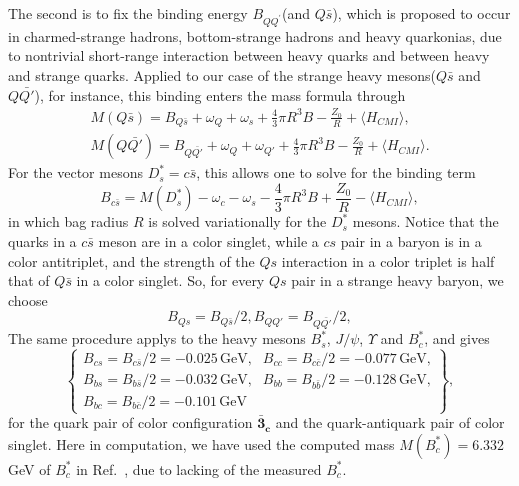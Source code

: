 \documentclass[12pt,onecolumn,floatfix,nofootinbib]{revtex4}
\begin{document}
The second is to fix the binding energy $B_{QQ^{\prime }}$(and $Q\bar{s}$),
which is proposed \cite{KR:2014gca} to occur in charmed-strange hadrons,
bottom-strange hadrons and heavy quarkonias, due to nontrivial short-range
interaction between heavy quarks and between heavy and strange quarks\cite%
{KR:2014gca,Karliner:2017elp,Karliner:2018bms}. Applied to our case of the
strange heavy mesons($Q\bar{s}$ and $Q\bar{Q\prime }$), for instance, this
binding enters the mass formula through
\begin{equation}
\begin{aligned}
M(Q\bar{s})=B_{Q\bar{s}}+\omega_{Q}+\omega_{s}+\frac{4}{3}\pi
R^{3}B-\frac{Z_{0}}{R}+ \langle H_{CMI} \rangle, \\
M(Q\bar{Q\prime})=B_{Q\bar{Q\prime}}+\omega_{Q}+\omega_{Q\prime}+\frac{4}{3}%
\pi R^{3}B-\frac{Z_{0}}{R}+ \langle H_{CMI} \rangle. \end{aligned}
\label{HLm0}
\end{equation}%
For the vector mesons $D_{s}^{\ast }=c\bar{s}$, this allows one to solve for
the binding term
\begin{equation}
B_{c\bar{s}}=M(D_{s}^{\ast })-\omega _{c}-\omega _{s}-\frac{4}{3}\pi R^{3}B+%
\frac{Z_{0}}{R}-\langle H_{CMI}\rangle ,  \label{BB0}
\end{equation}%
in which bag radius $R$ is solved variationally for the $D_{s}^{\ast }$
mesons. Notice that the quarks in a $c\bar{s}$ meson are in a color singlet,
while a $cs$ pair in a baryon is in a color antitriplet, and the strength of
the $Qs$ interaction in a color triplet is half that of $Q\bar{s}$ in a
color singlet. So, for every $Qs$ pair in a strange heavy baryon, we choose
\begin{equation}
B_{Qs}=B_{Q\bar{s}}/2,B_{QQ\prime }=B_{Q\bar{Q\prime }}/2,  \label{half}
\end{equation}%
The same procedure applys to the heavy mesons $B_{s}^{\ast }$, $J/\psi $, $%
\Upsilon $ and $B_{c}^{\ast }$, and gives
\begin{equation}
\begin{Bmatrix}
B_{cs}=B_{c\bar{s}}/2=-0.025\,\text{GeV,} & B_{cc}=B_{c\bar{c}}/2=-0.077\,%
\text{GeV,} \\
B_{bs}=B_{b\bar{s}}/2=-0.032\,\text{GeV,} & B_{bb}=B_{b\bar{b}}/2=-0.128\,%
\text{GeV,} \\
B_{bc}=B_{b\bar{c}}/2=-0.101\,\text{GeV} &
\end{Bmatrix}%
,  \label{bingdings}
\end{equation}%
for the quark pair of color configuration $\boldsymbol{\bar{3}_{c}}$ and the
quark-antiquark pair of color singlet. Here in computation, we have used the
computed mass $M(B_{c}^{\ast })=6.332$ GeV of $B_{c}^{\ast }$ in Ref.~\cite%
{Ebert:2002pp}, due to lacking of the measured $B_{c}^{\ast }$.
\end{document}
